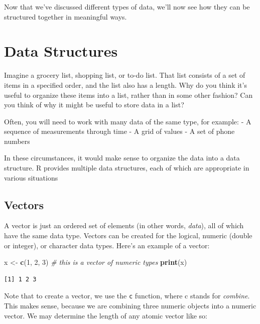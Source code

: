 \documentclass[
]{book}
\newenvironment{Shaded}{\begin{snugshade}}{\end{snugshade}}
\newcommand{\CommentTok}[1]{\textcolor[rgb]{0.56,0.35,0.01}{\textit{#1}}}
\newcommand{\DecValTok}[1]{\textcolor[rgb]{0.00,0.00,0.81}{#1}}
\newcommand{\KeywordTok}[1]{\textcolor[rgb]{0.13,0.29,0.53}{\textbf{#1}}}
\newcommand{\NormalTok}[1]{#1}
\newcommand{\StringTok}[1]{\textcolor[rgb]{0.31,0.60,0.02}{#1}}
\begin{document}
Now that we've discussed different types of data, we'll now see how they can be structured together in meaningful ways.

\hypertarget{data-structures}{%
\section{Data Structures}\label{data-structures}}

\begin{reflection}
Imagine a grocery list, shopping list, or to-do list. That list consists
of a set of items in a specified order, and the list also has a length.
Why do you think it's useful to organize these items into a list, rather
than in some other fashion? Can you think of why it might be useful to
store data in a list?
\end{reflection}

Often, you will need to work with many data of the same type, for example:
- A sequence of measurements through time
- A grid of values
- A set of phone numbers

In these circumstances, it would make sense to organize the data into a data structure.
R provides multiple data structures, each of which are appropriate in various situations

\hypertarget{vectors}{%
\subsection{Vectors}\label{vectors}}

A vector is just an ordered set of elements (in other words, \emph{data}), all of which have the same data type.
Vectors can be created for the logical, numeric (double or integer), or character data types.
Here's an example of a vector:

\begin{Shaded}
\begin{Highlighting}[]
\NormalTok{x <-}\StringTok{ }\KeywordTok{c}\NormalTok{(}\DecValTok{1}\NormalTok{, }\DecValTok{2}\NormalTok{, }\DecValTok{3}\NormalTok{)  }\CommentTok{# this is a vector of numeric types}
\KeywordTok{print}\NormalTok{(x)}
\end{Highlighting}
\end{Shaded}

\begin{verbatim}
[1] 1 2 3
\end{verbatim}

Note that to create a vector, we use the \texttt{c} function, where c stands for \emph{combine}.
This makes sense, because we are combining three numeric objects into a numeric vector.
We may determine the length of any atomic vector like so:
\end{document}
